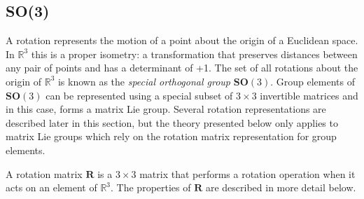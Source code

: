 		\begin{comment}	
		\textbf{Adjoint map}\\		
		EXPLANATION???\\
		For $A \in \mathbf{G}$ and $B \in ?$ define a function $\Psi$, known as the adjoint map of $\mathbf{G}$:
		\begin{equation}
			\Psi_A: \mathbf{G} \rightarrow \mathbf{G} \textnormal{, }
			\Psi_A(B) \stackrel{\Delta}{=} ABA^{-1}
		\end{equation}
		Taking the derivative:
		\begin{equation}
			\frac{\partial}{\partial t} \Psi_A(B(t))|_{t=0} = AVA^{-1} \textnormal{, }
			V \stackrel{\Delta}{=} 	\frac{\partial}{\partial t}B(t)|_{t=0}
		\end{equation}
		The adjoint	representation of $\mathbf{G}$ is given by the mapping
		\begin{equation}
			\textbf{Adj}_A: \mathfrak{g} \rightarrow \mathfrak{g} \textnormal{, }
			\textbf{Adj}_A(V) \stackrel{\Delta}{=} AVA^{-1}
		\end{equation}
		\end{comment}
		
	\subsection{\textbf{SO}(3)}	
		A rotation represents the motion of a point about the origin of a Euclidean space. In $\mathbb{R}^3$ this is a proper isometry: a transformation that preserves distances between any pair of points and has a determinant of +1. The set of all rotations about the origin of $\mathbb{R}^3$ is known as the \textit{special orthogonal group} $\textbf{SO}(3)$.
		Group elements of $\textbf{SO}(3)$ can be represented using a special subset of $3 \times 3$ invertible matrices and in this case, forms a matrix Lie group. Several rotation representations are described later in this section, but the theory presented below only applies to matrix Lie groups which rely on the rotation matrix representation for group elements.
		
		A rotation matrix $\mathbf{R}$ is a $3 \times 3$ matrix that performs a rotation operation when it acts on an element of $\mathbb{R}^3$. The properties of $\mathbf{R}$ are described in more detail below.
		
